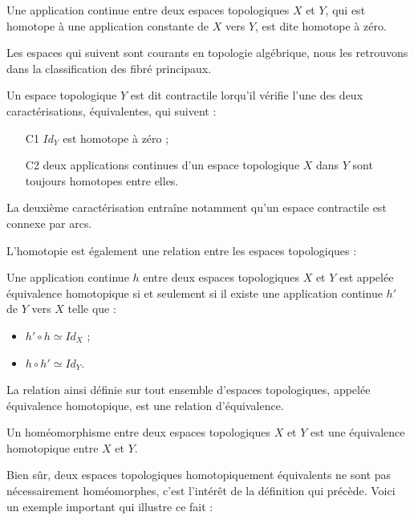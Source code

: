 \begin{defi}
Une application continue entre deux espaces topologiques $X$ et $Y$, qui est homotope \`a une application constante de $X$ vers $Y$, %
est dite homotope \`a z\'ero.
\end{defi}

Les espaces qui suivent sont courants en topologie alg\'ebrique, nous les retrouvons dans la classification des fibr\'e principaux.

\begin{prefi}
Un espace topologique $Y$ est dit contractile lorqu'il v\'erifie l'une des deux caract\'erisations, \'equivalentes, qui suivent :
\begin{itemize}
\item[C1] $Id_Y$ est homotope \`a z\'ero ;
\item[C2] deux applications continues d'un espace topologique $X$ dans $Y$ sont toujours homotopes entre elles.
\end{itemize}
\end{prefi}

La deuxi\`eme caract\'erisation entra\^ine notamment qu'un espace contractile est connexe par arcs.

L'homotopie est \'egalement une relation entre les espaces topologiques :

\begin{defi}
Une application continue $h$ entre deux espaces topologiques $X$ et $Y$ est appel\'ee \'equivalence homotopique si et seulement si %
il existe une application continue $h'$ de $Y$ vers $X$ telle que :
\begin{itemize}
\item $h'\circ h\simeq Id_X$ ;
\item $h\circ h'\simeq Id_Y$.
\end{itemize}
La relation ainsi d\'efinie sur tout ensemble d'espaces topologiques, appel\'ee \'equivalence homotopique, est une relation d'\'equivalence.
\end{defi}

\begin{exem}
Un hom\'eomorphisme entre deux espaces topologiques $X$ et $Y$ est une \'equivalence homotopique entre $X$ et $Y$.
\end{exem}

Bien s\^ur, deux espaces topologiques homotopiquement \'equivalents ne sont pas n\'ecessairement hom\'eomorphes, c'est l'int\'er\^et de la d\'efinition qui pr\'ec\`ede. %
Voici un exemple important qui illustre ce fait :

